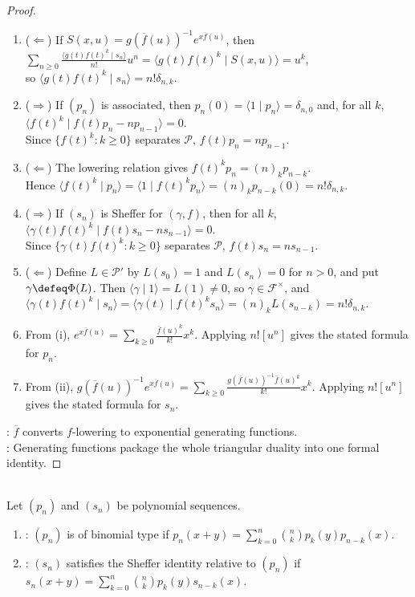\begin{theorem}
\begin{proof}
\begin{enumerate}[label=(\roman*).]
\item[$(ii)$]($\Leftarrow$) If $S(x,u)=g(\overline f(u))^{-1}e^{x\overline f(u)}$, then $\sum\limits_{n\geq0}\frac{\langle g(t)f(t)^k\mid s_n\rangle}{n!}u^n =\langle g(t)f(t)^k\mid S(x,u)\rangle=u^k$,\\
so $\langle g(t)f(t)^k\mid s_n\rangle=n!\delta_{n,k}$.
\item[$(iii)$]($\Rightarrow$) If $(p_n)$ is associated, then $p_n(0)=\langle 1\mid p_n\rangle=\delta_{n,0}$ and, for all $k$, $\langle f(t)^k\mid f(t)p_n-np_{n-1}\rangle=0$.\\
Since $\{f(t)^k:k\geq0\}$ separates $\mathscr{P}$, $f(t)p_n=np_{n-1}$.
\item[$(iii)$]($\Leftarrow$) The lowering relation gives $f(t)^kp_n=(n)_kp_{n-k}$.\\
Hence $\langle f(t)^k\mid p_n\rangle =\langle 1\mid f(t)^kp_n\rangle =(n)_kp_{n-k}(0)=n!\delta_{n,k}$.
\item[$(iv)$]($\Rightarrow$) If $(s_n)$ is Sheffer for $(\gamma,f)$, then for all $k$, $\langle \gamma(t)f(t)^k\mid f(t)s_n-ns_{n-1}\rangle=0$.\\
Since $\{\gamma(t)f(t)^k:k\geq0\}$ separates $\mathscr{P}$, $f(t)s_n=ns_{n-1}$.
\item[$(iv)$]($\Leftarrow$) Define $L\in\mathscr{P}'$ by $L(s_0)=1$ and $L(s_n)=0$ for $n>0$, and put $\gamma\defeq\Phi(L)$. Then $\langle\gamma\mid1\rangle=L(1)\neq0$, so $\gamma\in\mathscr{F}^{\times}$, and $\langle \gamma(t)f(t)^k\mid s_n\rangle=\langle \gamma(t)\mid f(t)^ks_n\rangle=(n)_kL(s_{n-k})=n!\delta_{n,k}$.
\item[$(v)$] From (i), $e^{x\overline f(u)} =\sum\limits_{k\geq0}\frac{\overline f(u)^k}{k!}x^k$. Applying $n![u^n]$ gives the stated formula for $p_n$.
\item[$(vi)$] From (ii), $g(\overline f(u))^{-1}e^{x\overline f(u)} =\sum\limits_{k\geq0} \frac{g(\overline f(u))^{-1}\overline f(u)^k}{k!}x^k$. Applying $n![u^n]$ gives the stated formula for $s_n$.
\end{enumerate}
: $\overline f$ converts $f$-lowering to exponential generating functions.\\
: Generating functions package the whole triangular duality into one formal identity.
\end{proof}
\end{theorem}

\begin{definition} \label{def:binomial-type-and-sheffer-identity} \\
Let $(p_n)$ and $(s_n)$ be polynomial sequences.
\begin{enumerate}[label=(\roman*)]
\setlength{\itemsep}{0pt}
\item {}: $(p_n)$ is of binomial type if $p_n(x+y)=\sum\limits_{k=0}^{n}\binom{n}{k}p_k(y)p_{n-k}(x)$.
\item {}: $(s_n)$ satisfies the Sheffer identity relative to $(p_n)$ if $s_n(x+y)=\sum\limits_{k=0}^{n}\binom{n}{k}p_k(y)s_{n-k}(x)$.
\end{enumerate}
\end{definition}


